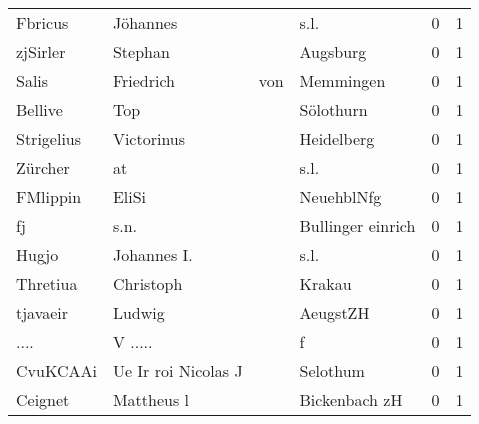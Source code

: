 \begin{center}
\begin{tiny}
\begin{longtabu}{llllrr}
                  Fbricus &                           Jöhannes &             &                                        s.l. &          0 &         1 \\
                 zjSirler &                            Stephan &             &                                    Augsburg &          0 &         1 \\
                    Salis &                          Friedrich &         von &                                   Memmingen &          0 &         1 \\
                  Bellive &                                Top &             &                                   Sölothurn &          0 &         1 \\
               Strigelius &                         Victorinus &             &                                  Heidelberg &          0 &         1 \\
                  Zürcher &                                 at &             &                                        s.l. &          0 &         1 \\
                 FMlippin &                              EliSi &             &                                  NeuehblNfg &          0 &         1 \\
                       fj &                               s.n. &             &                           Bullinger einrich &          0 &         1 \\
                    Hugjo &                        Johannes I. &             &                                        s.l. &          0 &         1 \\
                 Thretiua &                          Christoph &             &                                      Krakau &          0 &         1 \\
                 tjavaeir &                             Ludwig &             &                                    AeugstZH &          0 &         1 \\
                     .... &                            V ..... &             &                                           f &          0 &         1 \\
                 CvuKCAAi &                Ue Ir roi Nicolas J &             &                                    Selothum &          0 &         1 \\
                  Ceignet &                         Mattheus l &             &                               Bickenbach zH &          0 &         1 \\

\end{longtabu}
\end{tiny}
\end{center}
